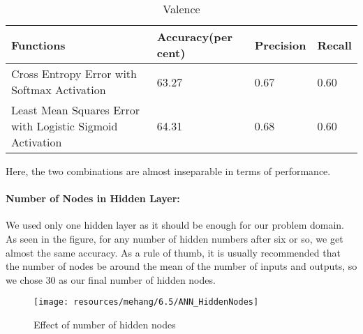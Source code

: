 \begin{table}[h!]
        \caption{Valence}
        \begin{center}
            \begin{tabular}{|p{8cm}|l|l|l|}
                        \hline

                        \textbf{Functions}
                        &
                        \textbf{Accuracy(per cent)}
                        &
                        \textbf{Precision}
                        &
                        \textbf{Recall}
                        \\\hline

                        Cross Entropy Error with Softmax Activation
                        &
                        63.27
                        &
                        0.67
                        &
                        0.60
                        \\\hline
                        
                        Least Mean Squares Error with Logistic Sigmoid Activation 
                        &
                        64.31
                        &
                        0.68
                        &
                        0.60
                        \\\hline

                 \end{tabular}
        \end{center}
\end{table}

Here, the two combinations are almost inseparable in terms of performance. 

\paragraph{Number of Nodes in Hidden Layer:}

We used only one hidden layer as it should be enough for our problem domain. 
As seen in the figure, for any number of hidden numbers after six or so, we get almost the same accuracy. As a rule of thumb, it is usually recommended that the number of nodes be around the mean of the number of inputs and outputs, so we chose 30 as our final number of hidden nodes.\\

\begin{figure}[h!]
        \centering
        \texttt{[image: resources/mehang/6.5/ANN\_HiddenNodes]}
        \caption{Effect of number of hidden nodes}
\end{figure}

